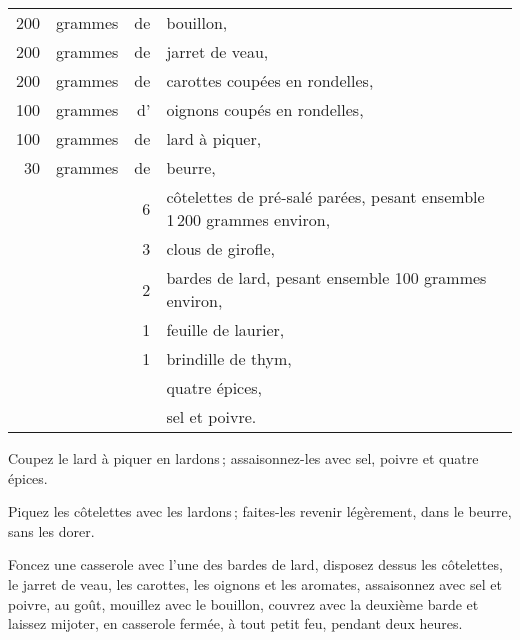 \footnotesize
\begin{longtable}{rrrp{16em}}
    200 & grammes & de & bouillon,                                                                        \\
    200 & grammes & de & jarret de veau,                                                                  \\
    200 & grammes & de & carottes coupées en rondelles,                                                   \\
    100 & grammes & d' & oignons coupés en rondelles,                                                     \\
    100 & grammes & de & lard à piquer,                                                                   \\
     30 & grammes & de & beurre,                                                                          \\
        &         &  6 & côtelettes de pré-salé parées, pesant ensemble 1 200 grammes environ,            \\
        &         &  3 & clous de girofle,                                                                \\
        &         &  2 & bardes de lard, pesant ensemble 100 grammes environ,                             \\
        &         &  1 & feuille de laurier,                                                              \\
        &         &  1 & brindille de thym,                                                               \\
        &         &    & quatre épices,                                                                   \\
        &         &    & sel et poivre.                                                                   \\
\end{longtable}
\normalsize

Coupez le lard à piquer en lardons ; assaisonnez-les avec sel, poivre et quatre
épices.

Piquez les côtelettes avec les lardons ; faites-les revenir légèrement, dans le
beurre, sans les dorer.

Foncez une casserole avec l’une des bardes de lard, disposez dessus les
côtelettes, le jarret de veau, les carottes, les oignons et les aromates,
assaisonnez avec sel et poivre, au goût, mouillez avec le bouillon, couvrez
avec la deuxième barde et laissez mijoter, en casserole fermée, à tout petit
feu, pendant deux heures.


